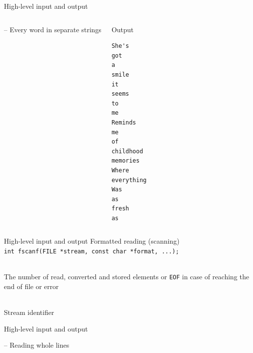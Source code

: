 \documentclass[usenames,dvipsnames,aspectratio=169]{beamer}
\begin{document}
\begin{frame}[fragile]{High-level input and output}
  \scriptsize
  \begin{columns}[T]
      \begin{exampleblock}{ -- Every word in separate strings}
        \vspace{-.3cm}
        
        \vspace{-.3cm}
      \end{exampleblock}
      \begin{block}{Output}
        \begin{verbatim}
She's
got
a
smile
it
seems
to
me
Reminds
me
of
childhood
memories
Where
everything
Was
as
fresh
as
\end{verbatim}
      \end{block}
  \end{columns}
\end{frame}

\begin{frame}{High-level input and output}
  Formatted reading (scanning)\\
  \footnotesize
  \texttt{int fscanf(FILE *stream, const char *format, ...);} \\
  \begin{description}[mm]
    \item[Return value] \hfill \\
      The number of read, converted and stored elements or \texttt{EOF} in case of reaching the end of file or error
    \item[\texttt{stream}] \hfill \\
      Stream identifier
  \end{description}
\end{frame}

\begin{frame}[fragile]{High-level input and output}
  \scriptsize
  \begin{exampleblock}{ -- Reading whole lines}
    \vspace{-.3cm}
    
    \vspace{-.3cm}
  \end{exampleblock}
\end{frame}
\end{document}
